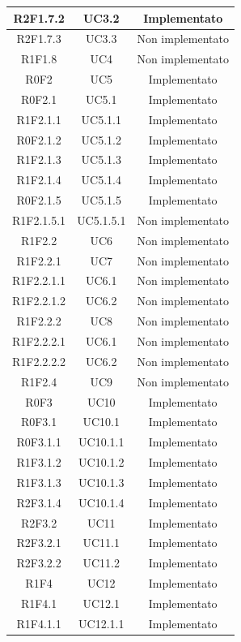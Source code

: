 \begin{longtable}{|c|c|c|}
	R2F1.7.2 & UC3.2 & Implementato\\
	\hline
	R2F1.7.3 & UC3.3 & Non implementato\\
	\hline
	R1F1.8 & UC4 & Non implementato\\
	\hline
	R0F2 & UC5 & Implementato\\
	\hline
	R0F2.1 & UC5.1 & Implementato\\
	\hline
	R1F2.1.1 & UC5.1.1 & Implementato\\
	\hline
	R0F2.1.2 & UC5.1.2 & Implementato\\
	\hline
	R1F2.1.3 & UC5.1.3 & Implementato\\
	\hline
	R1F2.1.4 & UC5.1.4 & Implementato\\
	\hline
	R0F2.1.5 & UC5.1.5 & Implementato\\
	\hline
	R1F2.1.5.1 & UC5.1.5.1 & Non implementato\\
	\hline
	R1F2.2 & UC6 & Non implementato\\
	\hline
	R1F2.2.1 & UC7 & Non implementato\\
	\hline
	R1F2.2.1.1 & UC6.1 & Non implementato\\
	\hline
	R1F2.2.1.2 & UC6.2 & Non implementato\\
	\hline
	R1F2.2.2 & UC8 & Non implementato\\
	\hline
	R1F2.2.2.1 & UC6.1 & Non implementato\\
	\hline
	R1F2.2.2.2 & UC6.2 & Non implementato\\
	\hline
	R1F2.4 & UC9 & Non implementato\\
	\hline
	R0F3 & UC10 & Implementato\\
	\hline
	R0F3.1 & UC10.1 & Implementato\\
	\hline
	R0F3.1.1 & UC10.1.1 & Implementato\\
	\hline
	R1F3.1.2 & UC10.1.2 & Implementato\\
	\hline
	R1F3.1.3 & UC10.1.3 & Implementato\\
	\hline
	R2F3.1.4 & UC10.1.4 & Implementato\\
	\hline
	R2F3.2 & UC11 & Implementato\\
	\hline
	R2F3.2.1 & UC11.1 & Implementato\\
	\hline
	R2F3.2.2 & UC11.2 & Implementato\\
	\hline
	R1F4 & UC12 & Implementato\\
	\hline
	R1F4.1 & UC12.1 & Implementato\\
	\hline
	R1F4.1.1 & UC12.1.1 & Implementato\\

\end{longtable}
